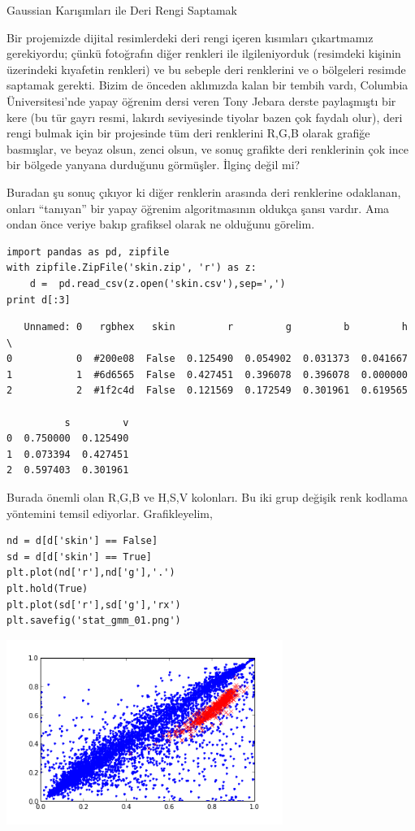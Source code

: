 \documentclass[12pt,fleqn]{article}\usepackage{../../common}
\begin{document}
Gaussian Karışımları ile Deri Rengi Saptamak

Bir projemizde dijital resimlerdeki deri rengi içeren kısımları çıkartmamız
gerekiyordu; çünkü fotoğrafın diğer renkleri ile ilgileniyorduk (resimdeki
kişinin üzerindeki kıyafetin renkleri) ve bu sebeple deri renklerini ve o
bölgeleri resimde saptamak gerekti. Bizim de önceden aklımızda kalan bir tembih
vardı, Columbia Üniversitesi'nde yapay öğrenim dersi veren Tony Jebara derste
paylaşmıştı bir kere (bu tür gayrı resmi, lakırdı seviyesinde tiyolar bazen çok
faydalı olur), deri rengi bulmak için bir projesinde tüm deri renklerini R,G,B
olarak grafiğe basmışlar, ve beyaz olsun, zenci olsun, ve sonuç grafikte deri
renklerinin çok ince bir bölgede yanyana durduğunu görmüşler. İlginç değil mi?

Buradan şu sonuç çıkıyor ki diğer renklerin arasında deri renklerine
odaklanan, onları ``tanıyan'' bir yapay öğrenim algoritmasının oldukça
şansı vardır. Ama ondan önce veriye bakıp grafiksel olarak ne olduğunu
görelim. 

\begin{verbatim}
import pandas as pd, zipfile
with zipfile.ZipFile('skin.zip', 'r') as z:
    d =  pd.read_csv(z.open('skin.csv'),sep=',')
print d[:3]
\end{verbatim}

\begin{verbatim}
   Unnamed: 0   rgbhex   skin         r         g         b         h  \
0           0  #200e08  False  0.125490  0.054902  0.031373  0.041667   
1           1  #6d6565  False  0.427451  0.396078  0.396078  0.000000   
2           2  #1f2c4d  False  0.121569  0.172549  0.301961  0.619565   

          s         v  
0  0.750000  0.125490  
1  0.073394  0.427451  
2  0.597403  0.301961  
\end{verbatim}

Burada önemli olan R,G,B ve H,S,V kolonları. Bu iki grup değişik renk
kodlama yöntemini temsil ediyorlar. Grafikleyelim,

\begin{verbatim}
nd = d[d['skin'] == False]
sd = d[d['skin'] == True]
plt.plot(nd['r'],nd['g'],'.')
plt.hold(True)
plt.plot(sd['r'],sd['g'],'rx')
plt.savefig('stat_gmm_01.png')
\end{verbatim}

\includegraphics[height=6cm]{stat_gmm_01.png}
\end{document}
